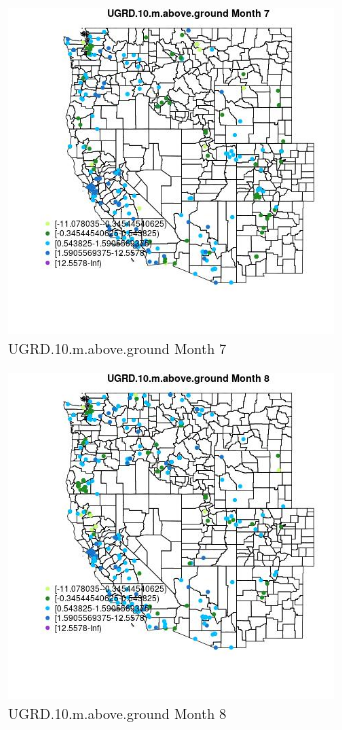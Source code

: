 \begin{figure} 
\centering  
\includegraphics[width=0.77\textwidth]{Code_Outputs/Report_ML_input_PM25_Step4_part_e_de_duplicated_aveswNAs_MapObsMo7UGRD10maboveground.jpg} 
\caption{\label{fig:Report_ML_input_PM25_Step4_part_e_de_duplicated_aveswNAsMapObsMo7UGRD10maboveground}UGRD.10.m.above.ground Month 7} 
\end{figure} 
 

\begin{figure} 
\centering  
\includegraphics[width=0.77\textwidth]{Code_Outputs/Report_ML_input_PM25_Step4_part_e_de_duplicated_aveswNAs_MapObsMo8UGRD10maboveground.jpg} 
\caption{\label{fig:Report_ML_input_PM25_Step4_part_e_de_duplicated_aveswNAsMapObsMo8UGRD10maboveground}UGRD.10.m.above.ground Month 8} 
\end{figure} 
 

